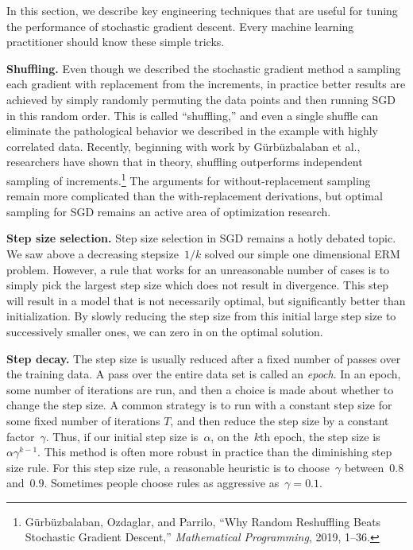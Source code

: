 \documentclass{tufte-book}
\begin{document}
In this section, we describe key engineering techniques that are useful
for tuning the performance of stochastic gradient descent. Every machine
learning practitioner should know these simple tricks.

\textbf{Shuffling.} Even though we described the stochastic gradient
method a sampling each gradient with replacement from the increments, in
practice better results are achieved by simply randomly permuting the
data points and then running SGD in this random order. This is called
``shuffling,'' and even a single shuffle can eliminate the pathological
behavior we described in the example with highly correlated data.
Recently, beginning with work by Gürbüzbalaban et al., researchers have
shown that in theory, shuffling outperforms independent sampling of
increments.\footnote{Gürbüzbalaban, Ozdaglar, and Parrilo, {``Why Random
  Reshuffling Beats Stochastic Gradient Descent,''} \emph{Mathematical
  Programming}, 2019, 1--36.} The arguments for without-replacement
sampling remain more complicated than the with-replacement derivations,
but optimal sampling for SGD remains an active area of optimization
research.

\textbf{Step size selection.} Step size selection in SGD remains a hotly
debated topic. We saw above a decreasing stepsize~\(1/k\) solved our
simple one dimensional ERM problem. However, a rule that works for an
unreasonable number of cases is to simply pick the largest step size
which does not result in divergence. This step will result in a model
that is not necessarily optimal, but significantly better than
initialization. By slowly reducing the step size from this initial large
step size to successively smaller ones, we can zero in on the optimal
solution.

\textbf{Step decay.} The step size is usually reduced after a fixed
number of passes over the training data. A pass over the entire data set
is called an \emph{epoch}. In an epoch, some number of iterations are
run, and then a choice is made about whether to change the step size. A
common strategy is to run with a constant step size for some fixed
number of iterations \(T\), and then reduce the step size by a constant
factor~\(\gamma\). Thus, if our initial step size is~\(\alpha\), on
the~\(k\)th epoch, the step size is~\(\alpha \gamma^{k-1}\). This method
is often more robust in practice than the diminishing step size rule.
For this step size rule, a reasonable heuristic is to choose~\(\gamma\)
between~\(0.8\) and~\(0.9\). Sometimes people choose rules as aggressive
as~\(\gamma = 0.1\).
\end{document}
